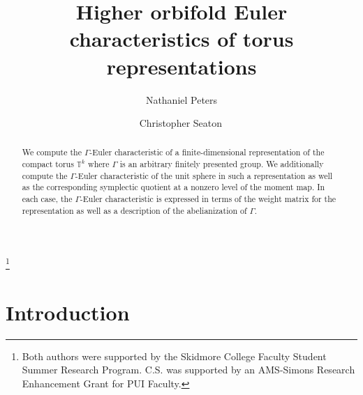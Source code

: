 \documentclass[twoside]{amsart}
\theoremstyle{definition}
\theoremstyle{remark}
\numberwithin{equation}{section}
\begin{document}
\title{Higher orbifold Euler characteristics of torus representations}

\author[N.~Peters]{Nathaniel Peters}
\address{Department of Mathematics and Statistics,
Skidmore College,
815 North Broadway,
Saratoga Springs, NY 12866, USA}

\author[C.~Seaton]{Christopher Seaton\,}
\address{Department of Mathematics and Statistics,
Skidmore College,
815 North Broadway,
Saratoga Springs, NY 12866, USA}



\thanks{Both authors were supported by the Skidmore College Faculty Student Summer Research Program.
C.S. was supported by an AMS-Simons Research Enhancement Grant for PUI Faculty.}

\begin{abstract}
We compute the $\Gamma$-Euler characteristic of a finite-dimensional representation of the compact torus $\mathbb{T}^k$
where $\Gamma$ is an arbitrary finitely presented group. We additionally compute the $\Gamma$-Euler characteristic
of the unit sphere in such a representation as well as the corresponding symplectic quotient at a nonzero level of the moment map.
In each case, the $\Gamma$-Euler characteristic is expressed in terms of the weight matrix for the representation as well
as a description of the abelianization of $\Gamma$.
\end{abstract}


\setcounter{tocdepth}{3}
\maketitle

\tableofcontents


\section{Introduction}
\label{sec:intro}
\end{document}
